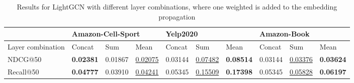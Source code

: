 \begin{table*}[]
    \begin{tabular}{|l|l|l|l|l|l|l|l|l|l|}
        \hline
                          & \multicolumn{3}{l|}{Amazon-Cell-Sport} & \multicolumn{3}{l|}{Yelp2020} & \multicolumn{3}{l|}{Amazon-Book}                                                                                                       \\ \hline
        Layer combination & Concat                                 & Sum                           & Mean                             & Concat  & Sum                 & Mean             & Concat  & Sum                 & Mean             \\ \hline
        NDCG@50           & \textbf{0.02381}                       & 0.01867                       & \underline{0.02075}              & 0.03144 & \underline{0.07482} & \textbf{0.08514} & 0.03144 & \underline{0.03376} & \textbf{0.03624} \\ \hline
        Recall@50         & \textbf{0.04777}                       & 0.03910                       & \underline{0.04241}              & 0.05345 & \underline{0.15509} & \textbf{0.17398} & 0.05345 & \underline{0.05828} & \textbf{0.06197} \\ \hline
    \end{tabular}
    \caption{Results for LightGCN with different layer combinations, where one weighted is added to the embedding propagation}
    \label{tab:lightgcn-1-weight}
\end{table*}
